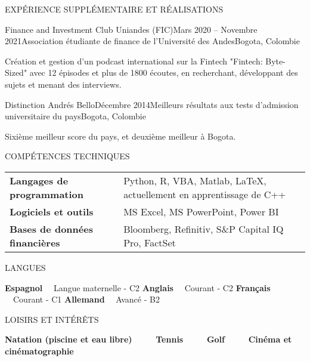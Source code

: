 \documentclass{resume} %
\begin{document}
    \vspace{0.5em}

%
%

\begin{rSection}{EXPÉRIENCE SUPPLÉMENTAIRE ET RÉALISATIONS}

\vspace{0.3em}
\begin{rSubsection}{Finance and Investment Club Uniandes (FIC)}{Mars 2020 – Novembre 2021}{Association étudiante de finance de l'Université des Andes}{Bogota, Colombie}
    \item Création et gestion d'un podcast international sur la Fintech "Fintech: Byte-Sized" avec 12 épisodes et plus de 1800 écoutes, en recherchant, développant des sujets et menant des interviews.
\end{rSubsection}

\begin{rSubsection}{Distinction Andrés Bello}{Décembre 2014}{Meilleurs résultats aux tests d'admission universitaire du pays}{Bogota, Colombie}
    \item Sixième meilleur score du pays, et deuxième meilleur à Bogota.
\end{rSubsection}

\end{rSection}

\vspace{0.5em}

%
%

\begin{rSection}{COMPÉTENCES TECHNIQUES}

\begin{tabular}{ @{} >{\bfseries}l @{\hspace{6ex}} l }
Langages de programmation &  Python, R, VBA, Matlab, \LaTeX, actuellement en apprentissage de C++ \\
Logiciels et outils & MS Excel, MS PowerPoint, Power BI \\
Bases de données financières & Bloomberg, Refinitiv, S\&P Capital IQ Pro, FactSet \\
\end{tabular}

\end{rSection}

\vspace{0.5em}

%
%

\begin{rSection}{LANGUES}

{\bf Espagnol} \ \ {Langue maternelle - C2} \hfill {\bf Anglais} \ \ {Courant - C2} \hfill {\bf Français} \ \ {Courant - C1} \hfill {\bf Allemand} \ \ {Avancé - B2}

\end{rSection}

\vspace{0.5em}

%
%

\begin{rSection}{LOISIRS ET INTÉRÊTS}

{\bf Natation (piscine et eau libre)} \ \ \ \ \ {\bf Tennis} \ \ \ \ \ {\bf Golf} \ \ \ \ \ {\bf Cinéma et cinématographie} 

\end{rSection}
\end{document}
